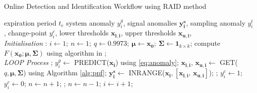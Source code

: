 \begin{algorithm}[H]
\caption{{Online Detection and Identification Workflow using RAID method}} \label{alg:detector}
 \begin{algorithmic}[1]
  \renewcommand{\algorithmicrequire}{\textbf{Input:}}
  \renewcommand{\algorithmicensure}{\textbf{Output:}}
  \REQUIRE expiration period $t_e$
  \ENSURE  system anomaly $y^g_i$, signal anomalies $\boldsymbol{y^s_i}$, sampling anomaly $y^t_i$, change-point $y^c_i$, lower thresholds $\boldsymbol{x_{l,i}}$, upper thresholds $\boldsymbol{x_{u,i}}$, 
 \\ \textit{Initialisation} : 
  \STATE $i \leftarrow 1;~ n \leftarrow 1;~ q \leftarrow 0.9973;~ \boldsymbol{\mu}  \leftarrow \boldsymbol{x_0};~  \boldsymbol{\Sigma} \leftarrow \mathbf{1}_{k \times k}$;
  \STATE compute $F(\boldsymbol{x_0}; \boldsymbol{\mu}, \boldsymbol{\Sigma})$ using algorithm in \cite{Genz2000};
 \\ \textit{LOOP Process}
  \LOOP
    ;
    \STATE $y^g_i \leftarrow$ PREDICT($\boldsymbol{x_i}$) using \eqref{eq:anomaly};
    \STATE $\boldsymbol{x_{l,i}}\text{, }\boldsymbol{x_{u,i}} \leftarrow$ GET($q, \boldsymbol{\mu}, \boldsymbol{\Sigma}$) using Algorithm \ref{alg:ppf};
    \STATE $\boldsymbol{y^s_i} \leftarrow$ INRANGE($\boldsymbol{x_i}, [\boldsymbol{x_{l,i}}\text{, }\boldsymbol{x_{u,i}}]$);
    \IF {\eqref{eq:anomaly} \OR \eqref{eq:condition}}
     ;
     \IF {\eqref{eq:condition}}
      \STATE $y^c_i \leftarrow 1$;
     \ELSE
      \STATE $y^c_i \leftarrow 0$;
     \ENDIF
     \STATE $n \leftarrow n + 1$;
      ;
      \STATE $n \leftarrow n - 1$;
     \ENDFOR
    \ENDIF
    \STATE $i \leftarrow i + 1$;
  \ENDLOOP
 \end{algorithmic}
\end{algorithm}
